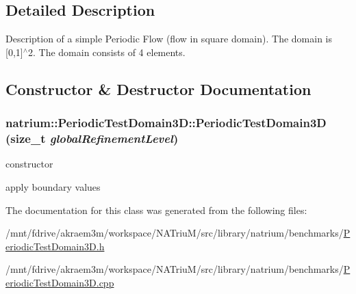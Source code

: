 \subsection{Detailed Description}
Description of a simple Periodic Flow (flow in square domain). The domain is \mbox{[}0,1\mbox{]}$^\wedge$2. The domain consists of 4 elements. 

\subsection{Constructor \& Destructor Documentation}
\hypertarget{classnatrium_1_1PeriodicTestDomain3D_a483fb92b4495d3ded8cf1a667b1c558f}{
\subsubsection[{PeriodicTestDomain3D}]{\setlength{\rightskip}{0pt plus 5cm}natrium::PeriodicTestDomain3D::PeriodicTestDomain3D (size\_\-t {\em globalRefinementLevel})}}
\label{classnatrium_1_1PeriodicTestDomain3D_a483fb92b4495d3ded8cf1a667b1c558f}


constructor 

apply boundary values 

The documentation for this class was generated from the following files:\begin{DoxyCompactItemize}
\item 
/mnt/fdrive/akraem3m/workspace/NATriuM/src/library/natrium/benchmarks/\hyperlink{PeriodicTestDomain3D_8h}{PeriodicTestDomain3D.h}\item 
/mnt/fdrive/akraem3m/workspace/NATriuM/src/library/natrium/benchmarks/\hyperlink{PeriodicTestDomain3D_8cpp}{PeriodicTestDomain3D.cpp}\end{DoxyCompactItemize}

